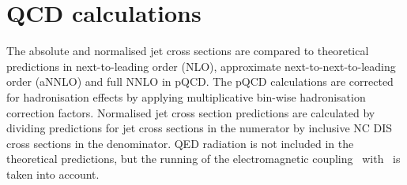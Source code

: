 \documentclass[12pt]{article}
\begin{document}
%
\section{QCD calculations}
\label{sec:nlo}
The absolute and normalised jet cross sections are compared to theoretical
predictions in next-to-leading order (NLO), approximate next-to-next-to-leading order (aNNLO)
and full NNLO in pQCD.
The pQCD calculations are corrected for hadronisation effects by applying multiplicative bin-wise hadronisation correction factors.
Normalised jet cross section predictions are calculated by dividing predictions
for jet cross sections in the numerator by inclusive NC DIS cross sections in the denominator.
QED radiation is not included in the theoretical predictions, but the running of the 
electromagnetic coupling~\cite{EPRC,AemParam} with \Qsq\ is taken into account.
\end{document}
